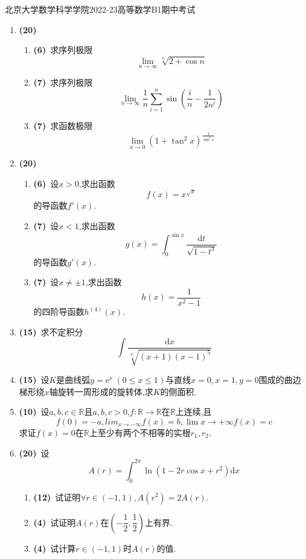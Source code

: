 \documentclass{ctexart}
\newcommand{\e}{\mathrm{e}}
\newcommand{\di}{\mathrm{d}}
\newcommand{\R}{\mathbb{R}}
\newcommand{\dx}{\di x}
\begin{document}
\pagestyle{empty}

\begin{center}\Large
    北京大学数学科学学院2022-23高等数学B1期中考试
\end{center}
\begin{enumerate}[leftmargin=*,label=\textbf{\arabic*.}]
    \item \textbf{(20)}
        \begin{enumerate}[label=\textbf{(\arabic*)},leftmargin=*]
            \item \textbf{(6)}\ 求序列极限$$\lim_{n\to\infty}{\sqrt[n]{2+\cos n}}$$
            \item \textbf{(7)}\ 求序列极限$$\lim_{n\to\infty}{\dfrac{1}{n}\sum_{i=1}^{n}{\sin\left(\dfrac{i}{n}-\dfrac{1}{2n^i}\right)}}$$
            \item \textbf{(7)}\ 求函数极限$$\lim_{x\to0}{\left(1+\tan^2 x\right)^{\frac{1}{\sin^2 x}}}$$
        \end{enumerate}
    \item \textbf{(20)}
        \begin{enumerate}[label=\textbf{(\arabic*)},leftmargin=*]
            \item \textbf{(6)}\ 设$x>0$,求出函数$$f(x)=x^{\sqrt{x}}$$的导函数$f'(x)$.
            \item \textbf{(7)}\ 设$x<1$,求出函数$$g(x)=\int_0^{\sin x}\dfrac{\di t}{\sqrt{1-t^3}}$$的导函数$g'(x)$.
            \item \textbf{(7)}\ 设$x\neq\pm 1$,求出函数$$h(x)=\dfrac{1}{x^2-1}$$的四阶导函数$h^{(4)}(x)$.
        \end{enumerate}
    \item \textbf{(15)}\ 求不定积分$$\int{\dfrac{\dx}{\sqrt[3]{(x+1)(x-1)^5}}}$$
    \item \textbf{(15)}\ 设$K$是曲线弧$y=\e^x\ (0\leqslant x\leqslant 1)$与直线$x=0,x=1,y=0$围成的曲边梯形绕$x$轴旋转一周形成的旋转体,求$K$的侧面积.
    \item \textbf{(10)}\ 设$a,b,c\in\R$且$a,b,c>0$,$f:\R\to\R$在$\R$上连续,且$$f(0)=-a,lim_{x\to-\infty}f(x)=b,\lim{x\to+\infty}f(x)=c$$求证$f(x)=0$在$\R$上至少有两个不相等的实根$r_1,r_2$.
    \item \textbf{(20)}\ 设$$A(r)=\int_0^{2\pi}\ln(1-2r\cos x+r^2)\dx$$
        \begin{enumerate}[label=\textbf{(\arabic*)},leftmargin=*]
            \item \textbf{(12)}\ 试证明$\displaystyle\forall r\in(-1,1),A(r^2)=2A(r)$.
            \item \textbf{(4)}\ 试证明$A(r)$在$\left(-\dfrac{1}{2},\dfrac{1}{2}\right)$上有界.
            \item \textbf{(4)}\ 试计算$r\in(-1,1)$时$A(r)$的值.
        \end{enumerate}
\end{enumerate}
\end{document}
